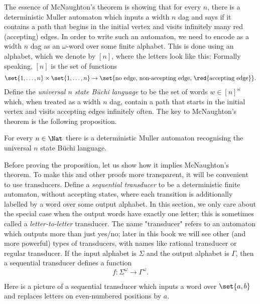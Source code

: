 The essence of  McNaughton's theorem is showing that for every $n$, there is a deterministic Muller automaton which inputs a  width $n$ dag and says if it contains a path that begins in the initial vertex and visits infinitely many red (accepting) edges. In order to write such an automaton, we need to encode as a width $n$ dag as an $\omega$-word over some finite alphabet. This is done using an alphabet, which we denote by $[n]$, where the letters look like this:
Formally speaking,  $[n]$ is the set of functions
\begin{align*}
  \set{1,\ldots,n} \times \set{1,\ldots,n} \to \set{\text{no edge, non-accepting edge, \red{accepting edge}}}.
\end{align*}
Define the \emph{universal $n$ state Büchi language} to be the set of words $w \in [n]^\omega$ which, when treated as a width $n$  dag, contain a path that starts in the initial vertex and  visits accepting edges infinitely often.  The key to McNaughton's theorem is the following proposition.

\begin{proposition}\label{prop:universal-language}
For every  $n \in \Nat$  there is a deterministic Muller automaton recognising the universal $n$ state Büchi language.
\end{proposition}

Before proving the proposition, let us show how it implies McNaughton's theorem. To make this and other proofs more transparent, it will be convenient to use transducers. Define a \emph{sequential transducer} to be a deterministic finite automaton, without accepting states, where each transition is additionally labelled by a word over  some output alphabet. In this section, we only care about the special case when the output words have exactly one letter; this is sometimes called a \emph{letter-to-letter} transducer. The name "transducer" refers to an automaton which outputs more than just yes/no; later in this book we will see  other (and more powerful) types of transducers, with names like rational transducer or regular transducer.
 If the input alphabet is $\Sigma$ and the output alphabet is $\Gamma$, then a sequential transducer defines a function $$ f : \Sigma^\omega \to \Gamma^\omega.$$ 

\begin{example}
Here is a picture of a sequential 	transducer which inputs a word over $\set{a,b}$ and replaces letters on even-numbered positions by $a$.
\end{example}


